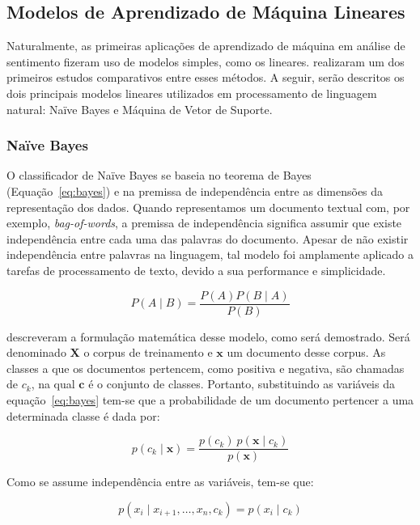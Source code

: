 \subsection{Modelos de Aprendizado de Máquina Lineares}

Naturalmente, as primeiras aplicações de aprendizado de máquina em análise de
sentimento fizeram uso de modelos simples, como os lineares.
\citet{pang02} realizaram um dos primeiros estudos comparativos entre esses
métodos.
A seguir, serão descritos os dois principais modelos lineares utilizados em
processamento de linguagem natural: Naïve Bayes e Máquina de Vetor de Suporte.

\subsubsection{Naïve Bayes}

O classificador de Naïve Bayes se baseia no teorema de Bayes
(Equação~\ref{eq:bayes}) e na premissa de independência entre as dimensões da
representação dos dados.
Quando representamos um documento textual com, por exemplo, \textit{bag-of-words},
a premissa de independência significa assumir que existe independência entre
cada uma das palavras do documento.
Apesar de não existir independência entre palavras na linguagem, tal modelo foi
amplamente aplicado a tarefas de processamento de texto, devido a sua performance
e simplicidade.

\begin{equation} \label{eq:bayes}
    P(A\mid B) = \frac{P(A) P(B \mid A)}{P(B)}
\end{equation}

\citet{schutze08} descreveram a formulação matemática desse modelo, como será
demostrado.
Será denominado $\mathbf{X}$ o corpus de treinamento e $\mathbf{x}$ um documento
desse corpus.
As classes a que os documentos pertencem, como positiva e negativa, são chamadas de
$c_k$, na qual $\mathbf{c}$ é o conjunto de classes.
Portanto, substituindo as variáveis da equação~\ref{eq:bayes} tem-se que a
probabilidade de um documento pertencer a uma determinada classe é dada por:

\begin{equation}
    p(c_k \mid \mathbf{x}) = \frac{p(c_k) \ p(\mathbf{x} \mid c_k)}{p(\mathbf{x})}
\end{equation}

Como se assume independência entre as variáveis, tem-se que:

\begin{equation}
    p(x_i \mid x_{i+1}, \dots ,x_{n}, c_k ) = p(x_i \mid c_k)
\end{equation}

